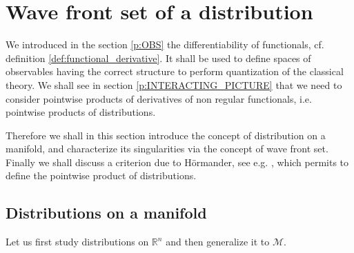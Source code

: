 \documentclass[11pt]{book}
\newcommand{\Mcal}{\mathcal{M}}
\newcommand{\Rbb}{\mathbb{R}}
\theoremstyle{break}
\begin{document}
\section{Wave front set of a distribution}


We introduced in the section \ref{p:OBS} the differentiability of functionals, cf. definition \ref{def:functional_derivative}. It shall be used to define spaces of observables having the correct structure to perform quantization of the classical theory. We shall see in section \ref{p:INTERACTING_PICTURE} that we need to consider pointwise products of derivatives of non regular functionals, i.e. pointwise products of distributions. 


Therefore we shall in this section introduce the concept of distribution on a manifold, and characterize its singularities via the concept of wave front set. Finally we shall discuss a criterion due to Hörmander, see e.g. \cite{HORMANDER_1990}, which permits to define the pointwise product of distributions.


\subsection{Distributions on a manifold}
\label{p:DISTRIB}


Let us first study distributions on $\Rbb^n$ and then generalize it to $\Mcal$. 


\bigskip
\end{document}
